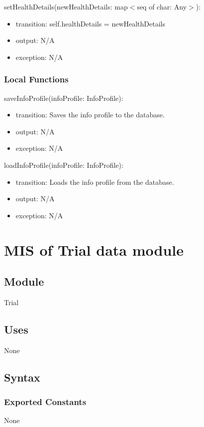 \documentclass[12pt, titlepage]{article}
\begin{document}
\noindent setHealthDetails(newHealthDetails: map$<$seq of char: Any$>$):
\begin{itemize}
\item transition: self.healthDetails = newHealthDetails
\item output: N/A
\item exception: N/A
\end{itemize}

\subsubsection{Local Functions}
\noindent saveInfoProfile(infoProfile: InfoProfile):
\begin{itemize}
\item transition: Saves the info profile to the database.
\item output: N/A
\item exception: N/A
\end{itemize}

\noindent loadInfoProfile(infoProfile: InfoProfile):
\begin{itemize}
\item transition: Loads the info profile from the database.
\item output: N/A
\item exception: N/A
\end{itemize}

\newpage


\section{MIS of Trial data module} \label{Trial}

\subsection{Module}
Trial

\subsection{Uses}
None

\subsection{Syntax}

\subsubsection{Exported Constants}
None
\end{document}
